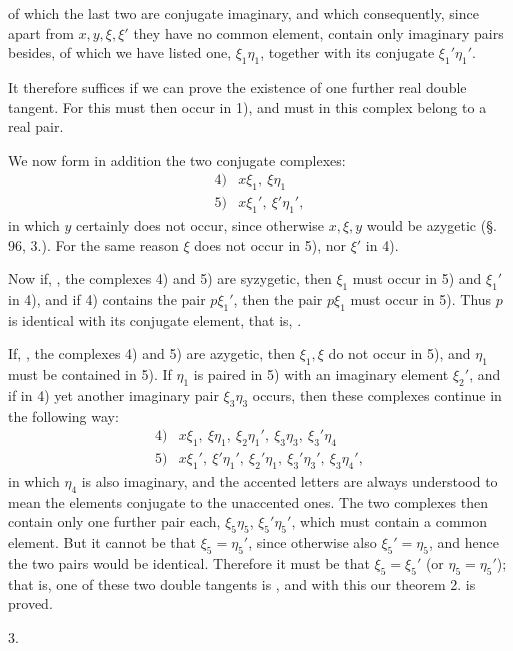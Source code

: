 of which the last two are conjugate imaginary, and which consequently,
since apart from $x, y, \xi, \xi'$ they have no common element, contain
only imaginary pairs besides, of which we have listed one, $\xi_1\eta_1$,
together with its conjugate $\xi_1'\eta_1'$.

It therefore suffices if we can prove the existence of one further real
double tangent. For this must then occur in 1), and must in this complex
belong to a real pair.

We now form in addition the two conjugate complexes:
\[
\begin{array}{rl}
4) & x\xi_1,\ \xi\eta_1 \\
5) & x\xi_1',\ \xi'\eta_1',
\end{array}
\]
in which $y$ certainly does not occur, since otherwise $x, \xi, y$ would be
azygetic (\S.\,96, 3.). For the same reason $\xi$ does not occur in 5),
nor $\xi'$ in 4).

Now if, , the complexes 4) and 5) are syzygetic, then
$\xi_1$ must occur in 5) and $\xi_1'$ in 4), and if 4) contains the pair $p\xi_1'$,
then the pair $p\xi_1$ must occur in 5). Thus $p$ is identical with its
conjugate element, that is, .

If, , the complexes 4) and 5) are azygetic, then $\xi_1, \xi$ do
not occur in 5), and $\eta_1$ must be contained in 5).
If $\eta_1$ is paired in 5) with an imaginary element $\xi_2'$, and
if in 4) yet another imaginary pair $\xi_3\eta_3$ occurs, then these
complexes continue in the following way:
\[
\begin{array}{rl}
4) & x\xi_1,\ \xi\eta_1,\ \xi_2\eta_1',\ \xi_3\eta_3,\ \xi_3'\eta_4 \\
5) & x\xi_1',\ \xi'\eta_1',\ \xi_2'\eta_1,\ \xi_3'\eta_3',\ \xi_3\eta_4',
\end{array}
\]
in which $\eta_4$ is also imaginary, and the accented letters are always
understood to mean the elements conjugate to the unaccented ones.
The two complexes then contain only one further pair each, $\xi_5\eta_5$,
$\xi_5'\eta_5'$, which must contain a common element. But it cannot
be that $\xi_5 = \eta_5'$, since otherwise also $\xi_5' = \eta_5$, and
hence the two pairs would be identical. Therefore it must be that $\xi_5 = \xi_5'$ (or
$\eta_5 = \eta_5'$); that is, one of these two double tangents
is , and with this our theorem 2. is proved.

3. 
